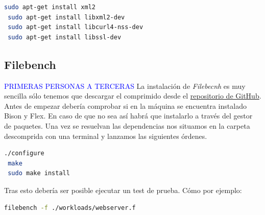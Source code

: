 \begin{lstlisting}[language=bash]
 sudo apt-get install xml2
 sudo apt-get install libxml2-dev
 sudo apt-get install libcurl4-nss-dev
 sudo apt-get install libssl-dev

\end{lstlisting}
\subsection{Filebench}
\textcolor{blue}{PRIMERAS PERSONAS A TERCERAS} La instalación de \textit{Filebecnh} es muy sencilla sólo tenemos que descargar el comprimido desde el \href{https://github.com/filebench/filebench/releases}{repositorio de \underline{GitHub}}. Antes de empezar debería comprobar si en la máquina se encuentra instalado Bison y Flex. En caso de que no sea así habrá que instalarlo a través del gestor de paquetes. Una vez se resuelvan las dependencias nos situamos en la carpeta descomprida con una terminal y lanzamos las siguientes órdenes. 

\begin{lstlisting}[language=bash]
 ./configure
 make
 sudo make install
\end{lstlisting}

Tras esto debería ser posible ejecutar un test de prueba. Cómo por ejemplo:
\begin{lstlisting}[language=bash]
 filebench -f ./workloads/webserver.f
\end{lstlisting}
